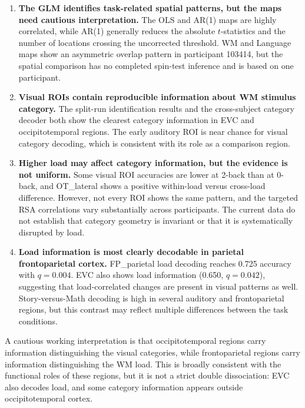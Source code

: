 \documentclass[11pt,a4paper]{article}
\begin{document}
\begin{enumerate}
    \item \textbf{The GLM identifies task-related spatial patterns, but the maps need cautious interpretation.} The OLS and AR(1) maps are highly correlated, while AR(1) generally reduces the absolute \(t\)-statistics and the number of locations crossing the uncorrected threshold. WM and Language maps show an asymmetric overlap pattern in participant 103414, but the spatial comparison has no completed spin-test inference and is based on one participant.

    \item \textbf{Visual ROIs contain reproducible information about WM stimulus category.} The split-run identification results and the cross-subject category decoder both show the clearest category information in EVC and occipitotemporal regions. The early auditory ROI is near chance for visual category decoding, which is consistent with its role as a comparison region.

    \item \textbf{Higher load may affect category information, but the evidence is not uniform.} Some visual ROI accuracies are lower at 2-back than at 0-back, and OT\_lateral shows a positive within-load versus cross-load difference. However, not every ROI shows the same pattern, and the targeted RSA correlations vary substantially across participants. The current data do not establish that category geometry is invariant or that it is systematically disrupted by load.

    \item \textbf{Load information is most clearly decodable in parietal frontoparietal cortex.} FP\_parietal load decoding reaches 0.725 accuracy with \(q=0.004\). EVC also shows load information (0.650, \(q=0.042\)), suggesting that load-correlated changes are present in visual patterns as well. Story-versus-Math decoding is high in several auditory and frontoparietal regions, but this contrast may reflect multiple differences between the task conditions.
\end{enumerate}

A cautious working interpretation is that occipitotemporal regions carry information distinguishing the visual categories, while frontoparietal regions carry information distinguishing the WM load. This is broadly consistent with the functional roles of these regions, but it is not a strict double dissociation: EVC also decodes load, and some category information appears outside occipitotemporal cortex.
\end{document}
